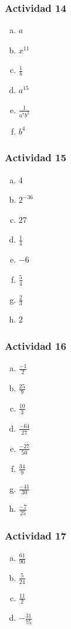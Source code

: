 \documentclass[a4paper, twocolumn]{article}
\begin{document}
\subsubsection*{Actividad 14}
\begin{enumerate}[a)]
\item $a$
\item $x^{11}$
\item $\frac{1}{b}$
\item $a^{15}$
\item $\frac{1}{a^7b^2}$
\item $b^4$

\end{enumerate}

\subsubsection*{Actividad 15}
\begin{enumerate}[a)]
\item $4$
\item ${2^{-36}}$
\item $27$
\item $\frac{1}{4}$
\item $-6$
\item $\frac{5}{4}$
\item $\frac{2}{3}$
\item $2$
\end{enumerate}

\subsubsection*{Actividad 16}
\begin{enumerate}[a)]
\item $\frac{-1}{2}$
\item $\frac{25}{9}$
\item $\frac{10}{3}$
\item $\frac{-64}{27}$
\item $\frac{-27}{50}$
\item $\frac{34}{9}$
\item $\frac{-41}{30}$
\item $\frac{-7}{25}$
\end{enumerate}

\subsubsection*{Actividad 17}
\begin{enumerate}[a)]
\item $\frac{61}{90}$
\item $\frac{5}{24}$
\item $\frac{11}{2}$
\item $-\frac{31}{75}$
\end{enumerate}
\end{document}
